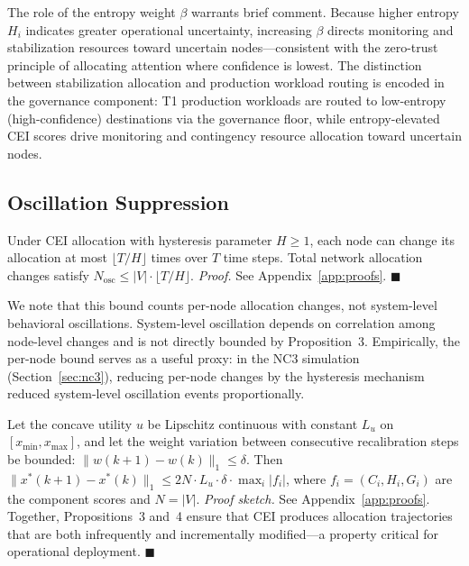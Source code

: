 \documentclass[runningheads]{llncs}
\begin{document}
The role of the entropy weight $\beta$ warrants brief comment. Because higher entropy $H_i$ indicates greater operational uncertainty, increasing $\beta$ directs monitoring and stabilization resources toward uncertain nodes---consistent with the zero-trust principle of allocating attention where confidence is lowest. The distinction between stabilization allocation and production workload routing is encoded in the governance component: T1 production workloads are routed to low-entropy (high-confidence) destinations via the governance floor, while entropy-elevated CEI scores drive monitoring and contingency resource allocation toward uncertain nodes.

\subsection{Oscillation Suppression}

\begin{proposition}
Under CEI allocation with hysteresis parameter $H \geq 1$, each node can change its allocation at most $\lfloor T/H \rfloor$ times over $T$ time steps. Total network allocation changes satisfy $N_{\text{osc}} \leq |V| \cdot \lfloor T/H \rfloor$. \emph{Proof.} See Appendix~\ref{app:proofs}. $\blacksquare$
\end{proposition}

We note that this bound counts per-node allocation changes, not system-level behavioral oscillations. System-level oscillation depends on correlation among node-level changes and is not directly bounded by Proposition~3. Empirically, the per-node bound serves as a useful proxy: in the NC3 simulation (Section~\ref{sec:nc3}), reducing per-node changes by the hysteresis mechanism reduced system-level oscillation events proportionally.

\begin{proposition}
Let the concave utility $u$ be Lipschitz continuous with constant $L_u$ on $[x_{\min}, x_{\max}]$, and let the weight variation between consecutive recalibration steps be bounded: $\|w(k+1) - w(k)\|_1 \leq \delta$. Then $\|x^*(k+1) - x^*(k)\|_1 \leq 2N \cdot L_u \cdot \delta \cdot \max_i |f_i|$, where $f_i = (C_i, H_i, G_i)$ are the component scores and $N = |V|$. \emph{Proof sketch.} See Appendix~\ref{app:proofs}. Together, Propositions~3 and~4 ensure that CEI produces allocation trajectories that are both infrequently and incrementally modified---a property critical for operational deployment. $\blacksquare$
\end{proposition}
\end{document}

